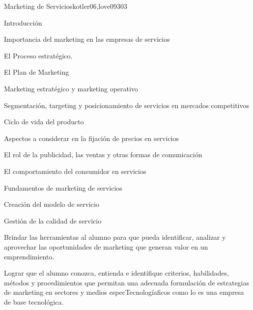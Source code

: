 \begin{syllabus}
\begin{unit}{Marketing de Servicios}{kotler06,love09}{30}{3}
\begin{topics}
      \item Introducción
      \item Importancia del marketing en las empresas de servicios
      \item El Proceso estratégico.
      \item El Plan de Marketing
      \item Marketing estratégico y marketing operativo
      \item Segmentación, targeting y posicionamiento de servicios en mercados competitivos
      \item Ciclo de vida del producto
       \item Aspectos a considerar en la fijación de precios en servicios
       \item El rol de la publicidad, las ventas y otras formas de comunicación
      \item El comportamiento del consumidor en servicios
      \item Fundamentos de marketing de servicios
      \item Creación del modelo de servicio
      \item Gestión de la calidad de servicio
   \end{topics}
   \begin{learningoutcomes}
      \item Brindar las herramientas al alumno para que pueda identificar, analizar y aprovechar las oportunidades de marketing que generan valor en un emprendimiento.
      \item Lograr que el alumno conozca, entienda e identifique criterios, habilidades, métodos y procedimientos que permitan una adecuada formulación de estrategias de marketing en sectores y medios especTecnologíaficos como lo es una empresa de base tecnológica.
   \end{learningoutcomes}
\end{unit}


\end{syllabus}

